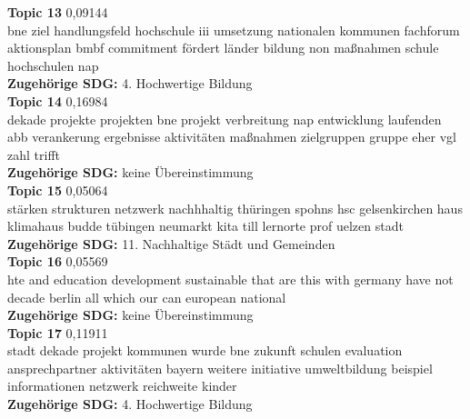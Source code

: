\documentclass[letterpaper]{article}
\begin{document}
\textbf{Topic 13} 0,09144 \\
     bne ziel handlungsfeld hochschule iii umsetzung nationalen kommunen fachforum aktionsplan bmbf commitment fördert länder bildung non maßnahmen schule hochschulen nap    \\
    \textbf{Zugehörige SDG:} 4. Hochwertige Bildung \\

\textbf{Topic 14} 0,16984 \\
     dekade projekte projekten bne projekt verbreitung nap entwicklung laufenden abb verankerung ergebnisse aktivitäten maßnahmen zielgruppen gruppe eher vgl zahl trifft    \\
    \textbf{Zugehörige SDG:} keine Übereinstimmung \\
    
\textbf{Topic 15} 0,05064 \\
stärken strukturen netzwerk nachhhaltig thüringen spohns hsc gelsenkirchen haus klimahaus budde tübingen neumarkt kita till lernorte prof uelzen stadt \\
 \textbf{Zugehörige SDG:} 11. Nachhaltige Städt und Gemeinden \\
    
\textbf{Topic 16} 0,05569 \\
         hte and education development sustainable that are this with germany have not decade berlin all which our can european national\\
    \textbf{Zugehörige SDG:} keine Übereinstimmung \\

\textbf{Topic 17} 0,11911\\
     stadt dekade projekt kommunen wurde bne zukunft schulen evaluation ansprechpartner aktivitäten bayern weitere initiative umweltbildung beispiel informationen netzwerk reichweite kinder    \\
     \textbf{Zugehörige SDG:} 4. Hochwertige Bildung\\
\end{document}
